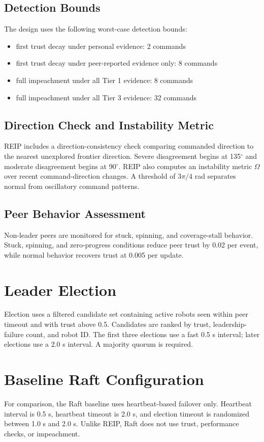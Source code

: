 \documentclass[a4paper,oneside,titlepage,11pt]{report}
\begin{document}
\subsection{Detection Bounds}
The design uses the following worst-case detection bounds:
\begin{itemize}
    \item first trust decay under personal evidence: 2 commands
    \item first trust decay under peer-reported evidence only: 8 commands
    \item full impeachment under all Tier 1 evidence: 8 commands
    \item full impeachment under all Tier 3 evidence: 32 commands
\end{itemize}

\subsection{Direction Check and Instability Metric}
REIP includes a direction-consistency check comparing commanded direction to the nearest unexplored frontier direction. Severe disagreement begins at 135$^{\circ}$ and moderate disagreement begins at 90$^{\circ}$. REIP also computes an instability metric $\Omega$ over recent command-direction changes. A threshold of $3\pi/4$ rad separates normal from oscillatory command patterns.

\subsection{Peer Behavior Assessment}
Non-leader peers are monitored for stuck, spinning, and coverage-stall behavior. Stuck, spinning, and zero-progress conditions reduce peer trust by 0.02 per event, while normal behavior recovers trust at 0.005 per update.

\section{Leader Election}
Election uses a filtered candidate set containing active robots seen within peer timeout and with trust above 0.5. Candidates are ranked by trust, leadership-failure count, and robot ID. The first three elections use a fast 0.5 s interval; later elections use a 2.0 s interval. A majority quorum is required.

\section{Baseline Raft Configuration}
For comparison, the Raft baseline uses heartbeat-based failover only. Heartbeat interval is 0.5 s, heartbeat timeout is 2.0 s, and election timeout is randomized between 1.0 s and 2.0 s. Unlike REIP, Raft does not use trust, performance checks, or impeachment.
\end{document}
